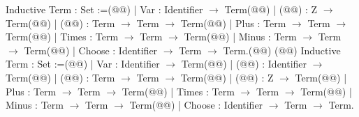 Inductive Term : Set :=(@\vspace{-0.04cm}@)
| Var : Identifier $\rightarrow$ Term(@\vspace{-0.04cm}@)
| (@@) : Z $\rightarrow$ Term(@\vspace{-0.04cm}@)
| (@@) : Term $\rightarrow$ Term $\rightarrow$ Term(@\vspace{-0.04cm}@)
| Plus : Term $\rightarrow$ Term $\rightarrow$ Term(@\vspace{-0.04cm}@)
| Times : Term $\rightarrow$ Term $\rightarrow$ Term(@\vspace{-0.04cm}@)
| Minus : Term $\rightarrow$ Term $\rightarrow$ Term(@\vspace{-0.04cm}@)
| Choose : Identifier $\rightarrow$ Term $\rightarrow$ Term.(@\vspace{-0.04cm}@)
(@\vspace{-0.14cm}@)
Inductive Term : Set :=(@\vspace{-0.04cm}@)
| Var : Identifier $\rightarrow$ Term(@\vspace{-0.04cm}@)
| (@@) : Identifier $\rightarrow$ Term(@\vspace{-0.04cm}@)
| (@@) : Term $\rightarrow$ Term $\rightarrow$ Term(@\vspace{-0.04cm}@)
| (@@) : Z $\rightarrow$ Term(@\vspace{-0.04cm}@)
| Plus : Term $\rightarrow$ Term $\rightarrow$ Term(@\vspace{-0.04cm}@)
| Times : Term $\rightarrow$ Term $\rightarrow$ Term(@\vspace{-0.04cm}@)
| Minus : Term $\rightarrow$ Term $\rightarrow$ Term(@\vspace{-0.04cm}@)
| Choose : Identifier $\rightarrow$ Term $\rightarrow$ Term.
